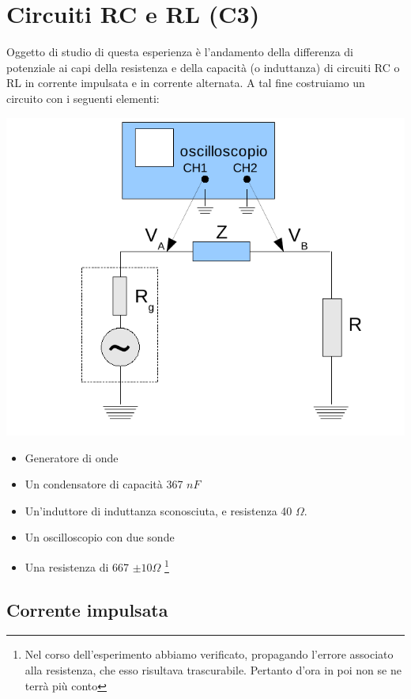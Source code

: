 \chapter{Circuiti RC e RL (C3)}

Oggetto di studio di questa esperienza è l'andamento della differenza di potenziale ai capi della resistenza e della capacità (o induttanza) di circuiti RC o RL in corrente impulsata e in corrente alternata.
A tal fine costruiamo un circuito con i seguenti elementi:

\begin{center}
 \includegraphics[scale=0.70]{grafici/C3/schema.png}
\end{center}

\begin{itemize}
  \item Generatore di onde
  \item Un condensatore di capacità 367 $nF$
  \item Un'induttore di induttanza sconosciuta, e resistenza 40 $\Omega$.
  \item Un oscilloscopio con due sonde
  \item Una resistenza di 667 $\pm 10 \Omega$  \footnote{Nel corso dell'esperimento abbiamo verificato, propagando l'errore associato alla resistenza, che esso risultava trascurabile. Pertanto d'ora in poi non se ne terrà più conto}
\end{itemize}

\section{Corrente impulsata}
